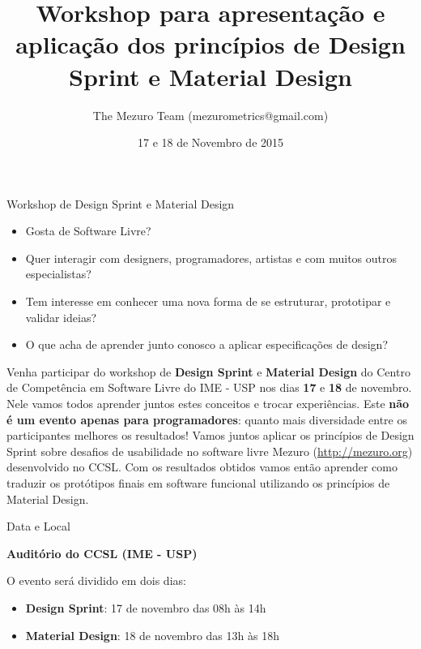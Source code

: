 \documentclass[final]{beamer} %
\title[Design Sprint \& Material Design]{Workshop para apresentação e aplicação dos princípios de Design Sprint e Material Design}
\author[Mezuro]{The Mezuro Team (mezurometrics@gmail.com)}
\institute[CCSL - IME - USP]{Centro de Competência em Software Livre, Instituto de Matemática e Estatística da universidade de São Paulo}
\date{17 e 18 de Novembro de 2015}
\begin{document}
  \begin{frame}{}
    \vfill
    {\veryHuge Workshop de Design Sprint e Material Design}
    \vfill
    \begin{itemize}
      \item {\large Gosta de Software Livre?}
      \item {\large Quer interagir com designers, programadores, artistas e com muitos outros especialistas?}
      \item {\large Tem interesse em conhecer uma nova forma de se estruturar, prototipar e validar ideias?}
      \item {\large O que acha de aprender junto conosco a aplicar especificações de design?}
    \end{itemize}
    \vfill
    {\large Venha participar do workshop de \textbf{Design Sprint} e \textbf{Material Design} do Centro de Competência em Software Livre do IME - USP nos dias \textbf{17} e \textbf{18} de novembro. Nele vamos todos aprender juntos estes conceitos e trocar experiências. Este \textbf{não é um evento apenas para programadores}: quanto mais diversidade entre os participantes melhores os resultados!}
    \vfill
    {\large Vamos juntos aplicar os princípios de Design Sprint sobre desafios de usabilidade no software livre Mezuro (\url{http://mezuro.org}) desenvolvido no CCSL. Com os resultados obtidos vamos então aprender como traduzir os protótipos finais em software funcional utilizando os princípios de Material Design.}
    \vfill
    \begin{block}{\large Data e Local}
      \begin{center}
        \textbf{Auditório do CCSL (IME - USP)}
      \end{center}

        O evento será dividido em dois dias:

        \begin{itemize}
          \item \textbf{Design Sprint}: 17 de novembro das 08h às 14h
          \item \textbf{Material Design}: 18 de novembro das 13h às 18h
        \end{itemize}


\end{block}
\end{frame}
\end{document}
